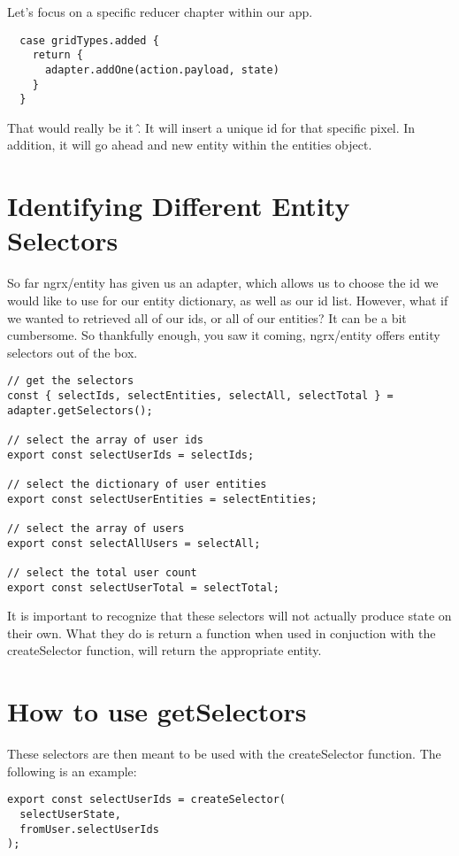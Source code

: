 Let's focus on a specific reducer chapter within our app.
\begin{verbatim}
  case gridTypes.added {
    return {
      adapter.addOne(action.payload, state)
    }
  }
\end{verbatim}

That would really be it \^. It will insert a unique id for that specific pixel.
In addition, it will go ahead and new entity within the entities object.

\section{ Identifying Different Entity Selectors }
So far ngrx/entity has given us an adapter, which allows us to choose the id
we would like to use for our entity dictionary, as well as our id list. However,
what if we wanted to retrieved all of our ids, or all of our entities? It can
be a bit cumbersome. So thankfully enough, you saw it coming, ngrx/entity
offers entity selectors out of the box.

\begin{lstlisting}
// get the selectors
const { selectIds, selectEntities, selectAll, selectTotal } = adapter.getSelectors();

// select the array of user ids
export const selectUserIds = selectIds;

// select the dictionary of user entities
export const selectUserEntities = selectEntities;

// select the array of users
export const selectAllUsers = selectAll;

// select the total user count
export const selectUserTotal = selectTotal;
\end{lstlisting}

It is important to recognize that these selectors will not actually produce
state on their own. What they do is return a function when used in
conjuction with the createSelector function, will return the appropriate
entity.

\section{ How to use getSelectors }
These selectors are then meant to be used with the createSelector function.
The following is an example:
\begin{verbatim}
export const selectUserIds = createSelector(
  selectUserState,
  fromUser.selectUserIds
);
\end{verbatim}

